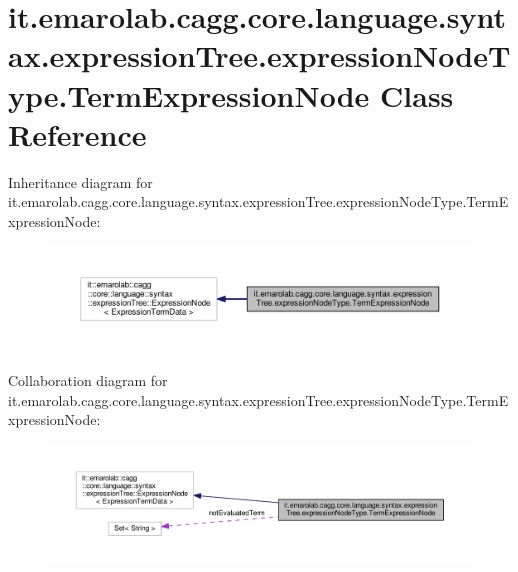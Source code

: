 \hypertarget{classit_1_1emarolab_1_1cagg_1_1core_1_1language_1_1syntax_1_1expressionTree_1_1expressionNodeType_1_1TermExpressionNode}{\section{it.\-emarolab.\-cagg.\-core.\-language.\-syntax.\-expression\-Tree.\-expression\-Node\-Type.\-Term\-Expression\-Node Class Reference}
\label{classit_1_1emarolab_1_1cagg_1_1core_1_1language_1_1syntax_1_1expressionTree_1_1expressionNodeType_1_1TermExpressionNode}
}


Inheritance diagram for it.\-emarolab.\-cagg.\-core.\-language.\-syntax.\-expression\-Tree.\-expression\-Node\-Type.\-Term\-Expression\-Node\-:\nopagebreak
\begin{figure}[H]
\begin{center}
\leavevmode
\includegraphics[width=350pt]{classit_1_1emarolab_1_1cagg_1_1core_1_1language_1_1syntax_1_1expressionTree_1_1expressionNodeTypf0a1d890e06b6ee6fc7c9f53abf768ab}
\end{center}
\end{figure}


Collaboration diagram for it.\-emarolab.\-cagg.\-core.\-language.\-syntax.\-expression\-Tree.\-expression\-Node\-Type.\-Term\-Expression\-Node\-:\nopagebreak
\begin{figure}[H]
\begin{center}
\leavevmode
\includegraphics[width=350pt]{classit_1_1emarolab_1_1cagg_1_1core_1_1language_1_1syntax_1_1expressionTree_1_1expressionNodeTypa27b04b2bd070c6537c4c639f386cf98}
\end{center}
\end{figure}
